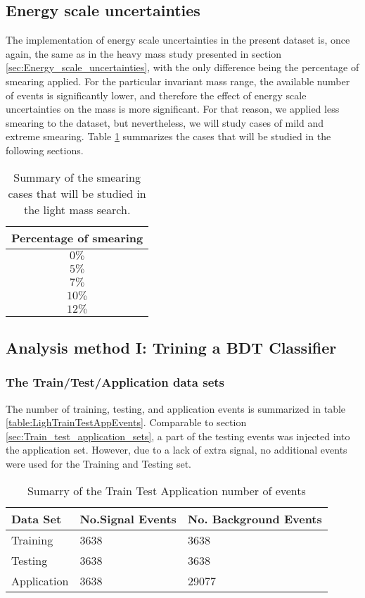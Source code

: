 \subsection{Energy scale uncertainties}
\label{sec:orgd17fb9c}
The implementation of energy scale uncertainties in the present dataset is, once again, the same as in the heavy mass study presented in section \ref{sec:Energy_scale_uncertainties}, with the only difference being the percentage of smearing applied. For the particular invariant mass range, the available number of events is significantly lower, and therefore the effect of energy scale uncertainties on the mass is more significant. For that reason, we applied less smearing to the dataset, but nevertheless, we will study cases of mild and extreme smearing. Table \ref{table:LightSmearings} summarizes the cases that will be studied in the following sections.
\begin{table}[h!]
\centering
\begin{tabular}{ |c|  }
 \hline
Percentage of smearing \\
 \hline
$0\%$\\
$5\%$\\
$7\%$\\
$10\%$\\
$12\%$\\
\hline
\end{tabular}
\caption{Summary of the smearing cases that will be studied in the light mass search. }
\label{table:LightSmearings}
\end{table}
\subsection{Analysis method I: Trining a BDT Classifier}
\label{sec:org5731c51}
\subsubsection{The Train/Test/Application data sets}
\label{sec:orgdbbb6aa}
The number of training, testing, and application events is summarized in table \ref{table:LighTrainTestAppEvents}. Comparable to  section \ref{sec:Train_test_application_sets}, a part of the testing events was injected into the application set. However, due to a lack of extra signal, no additional events were used for the Training and Testing set.
\begin{table}[h!]
\centering
\begin{tabular}{ |p{3cm}|p{3cm}|p{4cm}|  }
 \hline
Data Set & No.Signal Events & No. Background Events \\
 \hline
Training & 3638 & 3638 \\
Testing & 3638 & 3638 \\
Application & 3638 & 29077 \\
 \hline
\end{tabular}
\caption{Sumarry of the Train Test Application number of events}
\label{table:LightTrainTestAppEvents}
\end{table}

